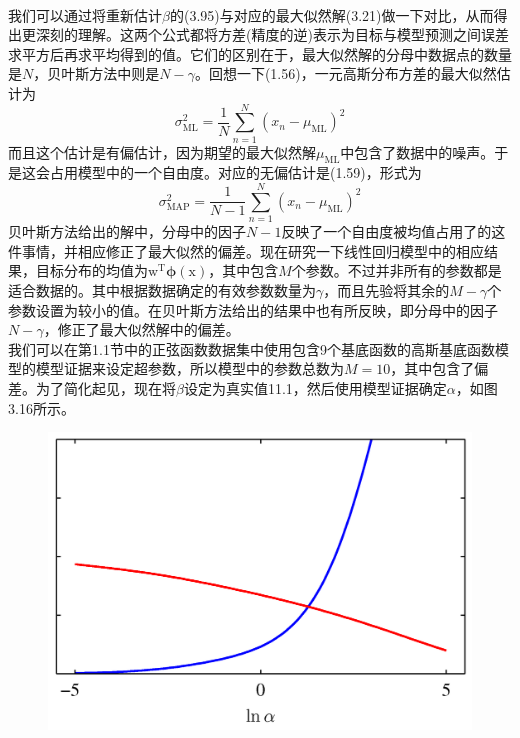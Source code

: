 \documentclass[b5paper]{book}
\numberwithin{equation}{chapter}
\newcommand {\bx} {\boldsymbol{\mathrm{x}}}
\newcommand {\bw} {\boldsymbol{\mathrm{w}}}
\newcommand {\rmT} {\mathrm{T}}
\newcommand {\bfphi} {\boldsymbol{\phi}}
\begin{document}
{\begin{figure}[ht]
		\label{fig:3-15}
	\end{figure}
	\\
	\indent 我们可以通过将重新估计$\beta$的(3.95)与对应的最大似然解(3.21)做一下对比，从而得出更深刻的理解。这两个公式都将方差(精度的逆)表示为目标与模型预测之间误差求平方后再求平均得到的值。它们的区别在于，最大似然解的分母中数据点的数量是$N$，贝叶斯方法中则是$N-\gamma$。回想一下(1.56)，一元高斯分布方差的最大似然估计为
	\begin{equation}
		\sigma_{\mathrm{ML}}^2 = \frac{1}{N}\sum_{n=1}^N (x_n - \mu_{\mathrm{ML}})^2
	\end{equation}
	而且这个估计是有偏估计，因为期望的最大似然解$\mu_{\mathrm{ML}}$中包含了数据中的噪声。于是这会占用模型中的一个自由度。对应的无偏估计是(1.59)，形式为
	\begin{equation}
		\sigma_{\mathrm{MAP}}^2 = \frac{1}{N-1}\sum_{n=1}^N (x_n - \mu_{\mathrm{ML}})^2
	\end{equation}
	贝叶斯方法给出的解中，分母中的因子$N-1$反映了一个自由度被均值占用了的这件事情，并相应修正了最大似然的偏差。现在研究一下线性回归模型中的相应结果，目标分布的均值为$\bw^{\rmT}\bfphi(\bx)$，其中包含$M$个参数。不过并非所有的参数都是适合数据的。其中根据数据确定的有效参数数量为$\gamma$，而且先验将其余的$M-\gamma$个参数设置为较小的值。在贝叶斯方法给出的结果中也有所反映，即分母中的因子$N-\gamma$，修正了最大似然解中的偏差。\\
	\indent 我们可以在第1.1节中的正弦函数数据集中使用包含9个基底函数的高斯基底函数模型的模型证据来设定超参数，所以模型中的参数总数为$M=10$，其中包含了偏差。为了简化起见，现在将$\beta$设定为真实值11.1，然后使用模型证据确定$\alpha$，如图3.16所示。
	\begin{figure}[ht]
		\begin{minipage}[t]{0.5\linewidth}
		\centering
		\includegraphics[scale=0.8]{Images/3-16a.png}

\end{minipage}
\end{figure}}
\end{document}
